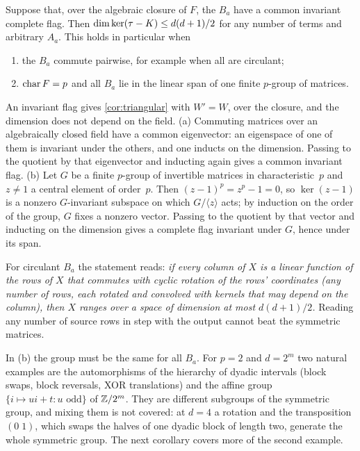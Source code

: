 \begin{corollary}\label{cor:commutative}
\notformalized
Suppose that, over the algebraic closure of $F$, the $B_a$ have a common invariant complete flag. Then
$\dim\ker(\tau-K)\le d(d+1)/2$ for any number of terms and arbitrary $A_a$. This holds in particular when
\begin{enumerate}[label=(\alph*),leftmargin=2em]
\item the $B_a$ commute pairwise, for example when all are circulant;
\item $\operatorname{char} F=p$ and all $B_a$ lie in the linear span of one finite $p$-group of matrices.
\end{enumerate}
\end{corollary}

\begin{informalproof}
An invariant flag gives \cref{cor:triangular} with $W'=W$, over the closure, and the dimension does not depend on the
field. (a) Commuting matrices over an algebraically closed field have a common eigenvector: an eigenspace of one of them
is invariant under the others, and one inducts on the dimension. Passing to the quotient by that eigenvector and
inducting again gives a common invariant flag. (b) Let $G$ be a finite $p$-group of invertible matrices in
characteristic~$p$ and $z\ne1$ a central element of order~$p$. Then $(z-1)^p=z^p-1=0$, so $\ker(z-1)$ is a nonzero
$G$-invariant subspace on which $G/\langle z\rangle$ acts; by induction on the order of the group, $G$ fixes a nonzero
vector. Passing to the quotient by that vector and inducting on the dimension gives a complete flag invariant under
$G$, hence under its span.
\end{informalproof}

For circulant $B_a$ the statement reads: \emph{if every column of $X$ is a linear function of the rows of $X$ that
commutes with cyclic rotation of the rows' coordinates (any number of rows, each rotated and convolved with kernels that
may depend on the column), then $X$ ranges over a space of dimension at most $d(d+1)/2$.} Reading any number of source
rows in step with the output cannot beat the symmetric matrices.

In (b) the group must be the same for all $B_a$. For $p=2$ and $d=2^m$ two natural examples are the automorphisms of
the hierarchy of dyadic intervals (block swaps, block reversals, XOR translations) and the affine group
$\{i\mapsto ui+t:u\text{ odd}\}$ of $\mathbb{Z}/2^m$. They are different subgroups of the symmetric group, and mixing them
is not covered: at $d=4$ a rotation and the transposition $(0\;1)$, which swaps the halves of one dyadic block of length
two, generate the whole symmetric group. The next corollary
covers more of the second example.

